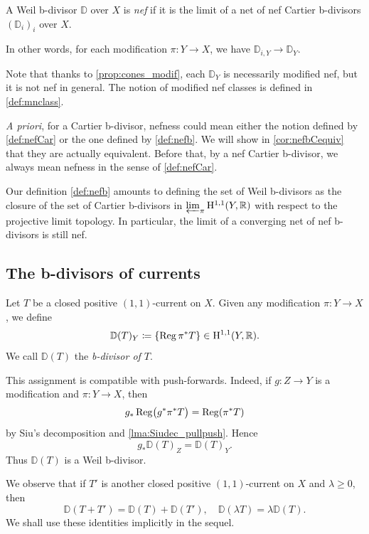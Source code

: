 \begin{definition}\label{def:nefb}
    A Weil b-divisor $\mathbb{D}$ over $X$ is \emph{nef} if it is the limit of a net of nef Cartier b-divisors $(\mathbb{D}_i)_i$ over $X$.
\end{definition}
In other words, for each modification $\pi\colon Y\rightarrow X$, we have $\mathbb{D}_{i,Y}\to \mathbb{D}_Y$.

Note that thanks to \cref{prop:cones_modif}, each $\mathbb{D}_Y$ is necessarily modified nef, but it is not nef in general. The notion of modified nef classes is defined in \cref{def:mnclass}.

\emph{A priori}, for a Cartier b-divisor, nefness could mean either the notion defined by \cref{def:nefCar} or the one defined by \cref{def:nefb}. We will show in \cref{cor:nefbCequiv} that they are actually equivalent. Before that, by a nef Cartier b-divisor, we always mean nefness in the sense of \cref{def:nefCar}.

Our definition \cref{def:nefb} amounts to defining the set of Weil b-divisors as the closure of the set of Cartier b-divisors in $\varprojlim_{\pi}\mathrm{H}^{1,1}(Y,\mathbb{R})$ with respect to the projective limit topology. In particular, the limit of a converging net of nef b-divisors is still nef.

\subsection{The b-divisors of currents}\label{subsec:b-div_curr}

\begin{definition}\label{def:DT}
Let $T$ be a closed positive $(1,1)$-current on $X$. Given any modification $\pi\colon Y\rightarrow X$, we define
\begin{equation}
\mathbb{D}(T)_Y\coloneqq \left\{ \operatorname{Reg} \pi^*T \right\}\in \mathrm{H}^{1,1}(Y,\mathbb{R}).
\end{equation}
We call $\mathbb{D}(T)$ the \emph{b-divisor of $T$}.
\end{definition}
This assignment is compatible with push-forwards. Indeed, if $g\colon Z\to Y$ is a modification and $\pi\colon Y\to X$, then
\[
    g_*\operatorname{Reg}\bigl(g^*\pi^*T\bigr)=\operatorname{Reg}(\pi^*T)
\]
by Siu's decomposition and \cref{lma:Siudec_pullpush}. Hence
\[
    g_*\mathbb D(T)_Z=\mathbb D(T)_Y.
\]
Thus $\mathbb D(T)$ is a Weil b-divisor.

We observe that if $T'$ is another closed positive $(1,1)$-current on $X$ and $\lambda\geq 0$, then
\[
\mathbb{D}(T+T')=\mathbb{D}(T)+\mathbb{D}(T'),\quad \mathbb{D}(\lambda T)=\lambda \mathbb{D}(T).
\]
We shall use these identities implicitly in the sequel.

